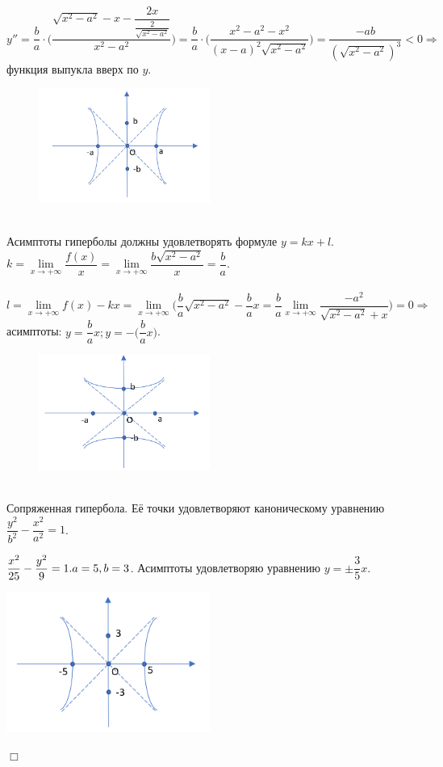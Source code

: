 \documentclass[a4paper, 12pt]{report}
\newenvironment{examp} %
{\par\noindent{\textbf{\textsc{Пример:}}}} %
{\hfill$\scriptstyle\Box$}
\begin{document}
$y'' = \dfrac{b}{a}\cdot\Big(\dfrac{\sqrt{x^2-a^2} - x - \dfrac{2x}{\frac{2}{\sqrt{x^2 - a^2}}}}{x^2 - a^2}\Big) = \dfrac{b}{a}\cdot\Big(\dfrac{x^2 - a^2 - x^2}{(x-a)^2\sqrt{x^2-a^2}}\Big) = \dfrac{-ab}{(\sqrt{x^2-a^2})^3} < 0 \Rightarrow$ функция выпукла вверх по $y$.\\
\begin{figure}[h]
	\centering
	\includegraphics[width=0.5\textwidth]{Гипербола_2.PNG}
	\label{fig:mpr}
\end{figure}\\
Асимптоты гиперболы должны удовлетворять формуле $y = kx + l$. $k = \lim\limits_{x \to +\infty}\dfrac{f(x)}{x} = \lim\limits_{x \to +\infty}\dfrac{b\sqrt{x^2 - a^2}}{x} = \dfrac{b}{a}$. \\\\
$l = \lim\limits_{x \to +\infty} f(x) - kx = \lim\limits_{x \to +\infty}\Big(\dfrac{b}{a}\sqrt{x^2-a^2} - \dfrac{b}{a}x = \dfrac{b}{a}\lim\limits_{x \to +\infty}\dfrac{-a^2}{\sqrt{x^2-a^2}+x}\Big) = 0 \Rightarrow$ 
асимптоты: $y = \dfrac{b}{a}x; y = -\Big(\dfrac{b}{a}x\Big)$.\\
\begin{figure}[h]
	\centering
	\includegraphics[width=0.5\textwidth]{Гипербола_3.PNG}
	\label{fig:mpr}
\end{figure}\\
Сопряженная гипербола. Её точки удовлетворяют каноническому уравнению $\dfrac{y^2}{b^2} - \dfrac{x^2}{a^2} = 1$.\\
\begin{examp}
	$\dfrac{x^2}{25} - \dfrac{y^2}{9} = 1.\\ a = 5, b = 3$. Асимптоты удовлетворяю уравнению $y = \pm\dfrac{3}{5}x$. 
	\begin{center}  
		\includegraphics[width=0.5\textwidth]{Гипербола_4.PNG}
	\end{center}
\end{examp}
\end{document}
